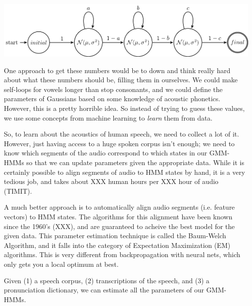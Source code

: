\documentclass[10pt,a4paper]{article}
\begin{document}
\begin{center}
\includegraphics[width=.9\textwidth,keepaspectratio]{figs/skeleton-hmm.png}
\end{center}

One approach to get these numbers would be to down and think really hard about what these numbers should be, filling them in ourselves. We could make self-loops for vowels longer than stop consonants, and we could define the parameters of Gaussians based on some knowledge of acoustic phonetics. However, this is a pretty horrible idea. So instead of trying to guess these values, we use some concepts from machine learning to \textit{learn} them from data.

So, to learn about the acoustics of human speech, we need to collect a lot of it. However, just having access to a huge spoken corpus isn't enough; we need to know which segments of the audio correspond to which states in our GMM-HMMs so that we can update parameters given the appropriate data. While it is certainly possible to align segments of audio to HMM states by hand, it is a very tedious job, and takes about XXX human hours per XXX hour of audio (TIMIT).

A much better approach is to automatically align audio segments (i.e. feature vectors) to HMM states. The algorithms for this alignment have been known since the 1960's (XXX), and are guaranteed to acheive the best model for the given data. This parameter estimation technique is called the Baum-Welch Algorithm, and it falls into the category of Expectation Maximization (EM) algorithms. This is very different from backpropagation with neural nets, which only gets you a local optimum at best.

Given (1) a speech corpus, (2) transcriptions of the speech, and (3) a pronunciation dictionary, we can estimate all the parameters of our GMM-HMMs.
\end{document}
